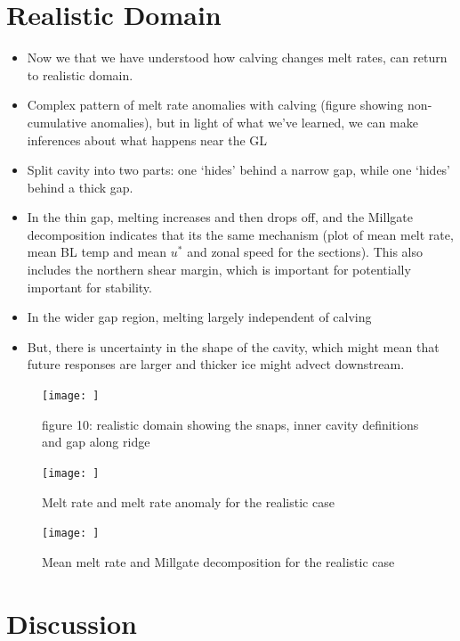 \documentclass[draft]{agujournal2019}
\begin{document}
\section{Realistic Domain}
\begin{itemize}
    \item Now we that we have understood how calving changes melt rates, can return to realistic domain.
    \item Complex pattern of melt rate anomalies with calving (figure showing non-cumulative anomalies), but in light of what we've learned, we can make inferences about what happens near the GL
    \item Split cavity into two parts: one `hides' behind a narrow gap, while one `hides' behind a thick gap. 
    \item In the thin gap, melting increases and then drops off, and the Millgate decomposition indicates that its the same mechanism (plot of mean melt rate, mean BL temp and mean $u^*$ and zonal speed for the sections). This also includes the northern shear margin, which is important for potentially important for stability.
    \item In the wider gap region, melting largely independent of calving 
    \item But, there is uncertainty in the shape of the cavity, which might mean that future responses are larger and thicker ice might advect downstream. 
\end{itemize}
\begin{figure}
    \centering
    \texttt{[image: ]}
    \caption{figure 10: realistic domain showing the snaps, inner cavity definitions and gap along ridge}
    \label{fig:my_label}
\end{figure}

\begin{figure}
    \centering
    \texttt{[image: ]}
    \caption{Melt rate and melt rate anomaly for the realistic case}
    \label{fig:figure11}
\end{figure}

\begin{figure}
    \centering
    \texttt{[image: ]}
    \caption{Mean melt rate and Millgate decomposition for the realistic case}
    \label{fig:figure12}
\end{figure}

\section{Discussion}
\end{document}
